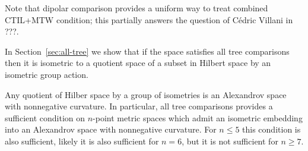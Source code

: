 Note that dipolar comparison provides a uniform way to treat combined CTIL+MTW condition;
this partially answers the question of Cédric Villani in ???.

In Section~\ref{sec:all-tree} we show that if the space satisfies all tree comparisons then it is isometric to a quotient space of a subset in Hilbert space by an isometric group action.

Any quotient of Hilber space by a group of isometries is an Alexandrov space with nonnegative curvature.
In particular, all tree comparisons provides a sufficient condition on $n$-point metric spaces which admit an isometric embedding into an Alexandrov space with nonnegative curvature.
For $n\le 5$ this condition is also sufficient, likely it is also sufficient for $n=6$, but it is not sufficient for $n\ge 7$.
